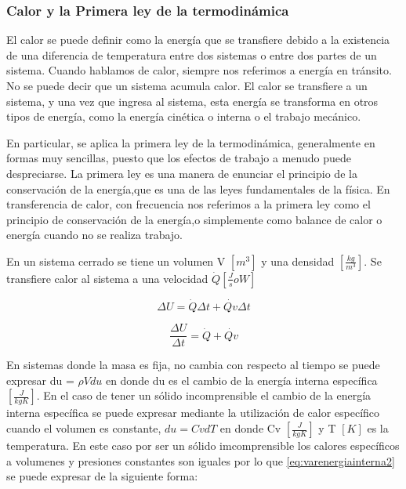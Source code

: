\documentclass[12pt,letterpaper]{article}     %
\begin{document}
\subsubsection{Calor y la Primera ley de la termodinámica}

 \cite[p\ 2-2]{Eduardo} El calor se puede definir como la energía que se transfiere debido a la existencia de una diferencia de temperatura entre dos sistemas o entre dos partes de un sistema. Cuando hablamos de calor, siempre nos referimos a energía en tránsito. No se puede decir que un sistema acumula calor. El calor se transfiere a un sistema, y una vez que ingresa al sistema, esta energía se transforma en otros tipos de energía, como la energía cinética o interna o el trabajo mecánico.

\cite[p\ 4]{Mills} En particular, se aplica la primera ley de la termodinámica, generalmente en formas muy sencillas, puesto que los efectos de trabajo a menudo puede despreciarse. La primera ley es una manera de enunciar el principio de la conservación de la energía,que es una de las leyes fundamentales de la física. En transferencia de calor, con frecuencia nos referimos a la primera ley como el principio de conservación de la energía,o simplemente como balance de calor o energía cuando no se realiza trabajo.


En un sistema cerrado se tiene un volumen V $[m^3]$ y una densidad $[\frac{kg}{m^3}]$. Se transfiere calor al sistema a una velocidad $\dot{Q}  [\frac{J}{s} o W]$

\begin{equation}
\Delta{U} = \dot{Q}\Delta t + \dot{Qv}\Delta t     
\label{eq:varenergiainterna}
\end{equation}

\begin{equation}
\frac{\Delta{U}}{\Delta t} = \dot{Q} + \dot{Qv}    
\label{eq:varenergiainterna2}
\end{equation}

En sistemas donde la masa es fija, no cambia con respecto al tiempo se puede expresar du = $ \rho V du $ en donde du es el cambio de la energía interna específica $[ \frac{J}{kgK}]$. En el caso de tener un sólido incomprensible el cambio de la energía interna específica se puede expresar mediante la utilización de calor específico cuando el volumen es constante, $du = Cv dT$ en donde Cv $[\frac{J}{kgK}]$ y T $[K]$ es la temperatura. En este caso por ser un sólido imcomprensible los calores específicos a volumenes y presiones  constantes son iguales por lo que \ref{eq:varenergiainterna2} se puede expresar de la siguiente forma:
\end{document}

